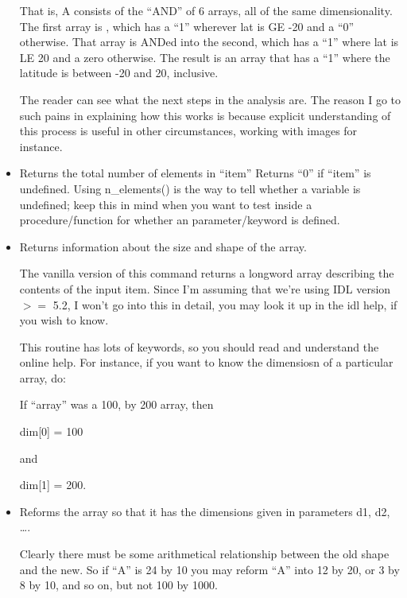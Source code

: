 \begin{itemize}
  That is, A consists of the ``AND'' of 6 arrays, all of the
  same dimensionality. The first array is , which has a
  ``1'' wherever lat is GE -20 and a ``0'' otherwise. That array is
  ANDed into the second,  which has a ``1'' where lat
  is LE 20 and a zero otherwise. The result is an array that has a
  ``1'' where the latitude is between -20 and 20, inclusive. 

  The reader can see what the next steps in the analysis are. The
  reason I go to such pains in explaining how this works is because
  explicit understanding of this process is useful in other
  circumstances, working with images for instance.

        
    \item {}

    Returns the total number of elements in ``item'' Returns ``0'' if
  ``item'' is undefined. Using n\_elements() is the  way to
  tell whether a variable is undefined; keep this in mind when you
  want to test inside a procedure/function for whether an
  parameter/keyword is defined.

    \item {}

        Returns information about the size and shape of the
  array.  

  The vanilla version of this command returns a longword array
  describing the contents of the input item. Since I'm assuming that
  we're using IDL version $>=$ 5.2, I won't go into this in detail,
  you may look it up in the idl help, if you wish to know.

  This routine has lots of keywords, so you should read and
  understand the online help. For instance, if you want to know the
  dimensiosn of a particular array, do:


    If ``array'' was a 100, by 200 array, then 

    dim[0] = 100

    and
    
    dim[1] = 200.

    \item {}

        Reforms the array so that it has the dimensions given in
    parameters d1, d2, \ldots.

    Clearly there must be some arithmetical relationship between the
    old shape and the new. So if ``A'' is 24 by 10 you may reform
    ``A'' into 12 by 20, or 3 by 8 by 10, and so on, but not 100 by
    1000.


\end{itemize}
